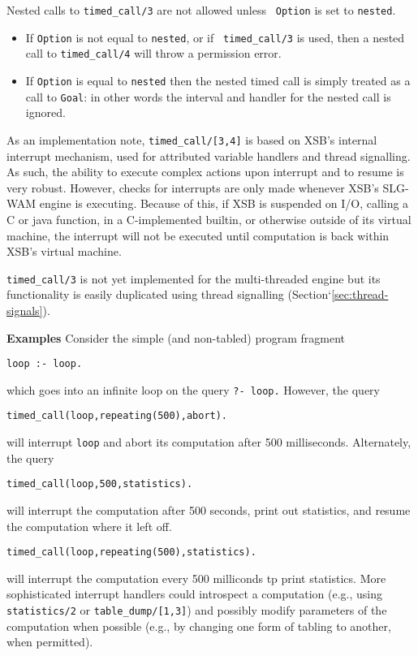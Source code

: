 \begin{description}
Nested calls to {\tt timed\_call/3} are not allowed unless {\tt
  Option} is set to {\tt nested}.
%
\begin{itemize}
\item If {\tt Option} is not equal to {\tt nested}, or if {\tt
  timed\_call/3} is used, then a nested call to {\tt timed\_call/4}
  will throw a permission error.
\item If {\tt Option} is equal to {\tt nested} then the nested timed
  call is simply treated as a call to {\tt Goal}: in other words the
  interval and handler for the nested call is ignored.
\end{itemize}
%

As an implementation note, {\tt timed\_call/[3,4]} is based on XSB's
internal interrupt mechanism, used for attributed variable handlers
and thread signalling.  As such, the ability to execute complex
actions upon interrupt and to resume is very robust.  However, checks
for interrupts are only made whenever XSB's SLG-WAM engine is
executing.  Because of this, if XSB is suspended on I/O, calling a C
or java function, in a C-implemented builtin, or otherwise outside of
its virtual machine, the interrupt will not be executed until
computation is back within XSB's virtual machine.

{\tt timed\_call/3} is not yet implemented for the multi-threaded
engine but its functionality is easily duplicated using thread
signalling (Section`\ref{sec:thread-signals}).

{\bf Examples}
Consider the simple (and non-tabled) program fragment
\begin{verbatim}
loop :- loop.
\end{verbatim}
which goes into an infinite loop on the query {\tt ?- loop.}  However,
the query
\begin{verbatim}
timed_call(loop,repeating(500),abort).
\end{verbatim}
will interrupt {\tt loop} and abort its computation after 500
milliseconds.  Alternately, the query
\begin{verbatim}
timed_call(loop,500,statistics).
\end{verbatim}
will interrupt the computation after 500 seconds, print out
statistics, and resume the computation where it left off.
\begin{verbatim}
timed_call(loop,repeating(500),statistics).
\end{verbatim}
will interrupt the computation every 500 milliconds tp print
statistics.  More sophisticated interrupt handlers could introspect a
computation (e.g., using {\tt statistics/2} or {\tt table\_dump/[1,3]})
and possibly modify parameters of the computation when possible (e.g.,
by changing one form of tabling to another, when permitted).


\end{description}
